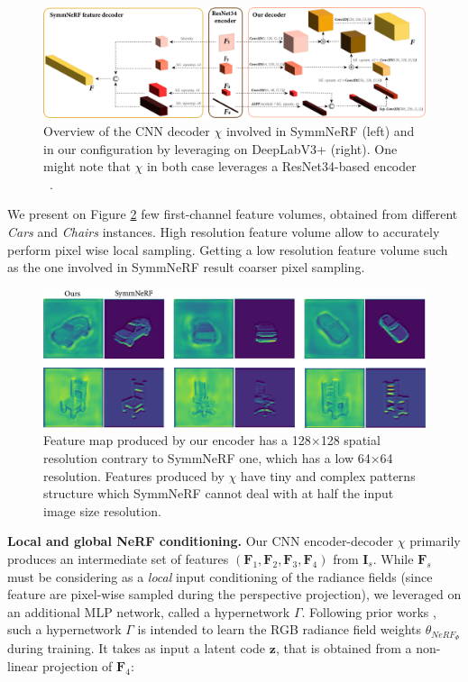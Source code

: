 \begin{figure}[h!]
  \begin{center}
  \includegraphics[width=\linewidth]{images/epinerf/feature_fusion_encoder.png}
  \end{center}
     \caption{Overview of the CNN decoder $\chi$ involved in SymmNeRF (left) and in our configuration by leveraging on DeepLabV3+ (right). One might note that $\chi$ in both case leverages a ResNet34-based encoder ~\cite{he2016deep}. }
  \label{fig:feature_encoder}
  \end{figure}

We present on Figure \ref{fig:feature_illustration} few first-channel feature volumes, obtained from different \textit{Cars} and \textit{Chairs} instances.  High resolution feature volume allow to accurately perform pixel wise local sampling. Getting a low resolution feature volume such as the one involved in SymmNeRF result coarser pixel sampling. 

\begin{figure}[h!]
\begin{center}
\includegraphics[width=.85\linewidth]{images/epinerf/feature_supp.png}
\end{center}
   \caption{Feature map produced by our encoder has a 128$\times$128 spatial resolution contrary to SymmNeRF one, which has a low  64$\times$64 resolution. Features produced by $\chi$ have tiny and complex patterns structure which SymmNeRF cannot deal with at half the input image size resolution.}
\label{fig:feature_illustration}
\end{figure}

\noindent\textbf{Local and global NeRF conditioning.} Our CNN encoder-decoder $\chi$ primarily produces an intermediate set of features $(\mathbf{F}_{1},\mathbf{F}_{2},\mathbf{F}_{3},\mathbf{F}_{4})$ from $\textbf{I}_{s}$. While $\mathbf{F}_{s}$ must be considering as a \textit{local} input conditioning of the radiance fields (since feature are pixel-wise sampled during the perspective projection), we leveraged on an additional MLP network, called a hypernetwork $\Gamma$. Following prior works \cite{SRN,symmnerf}, such a hypernetwork $\Gamma$ is intended to learn the RGB radiance field weights $\theta_{NeRF_{\Phi}}$ during training. It takes as input a latent code $\mathbf{z}$, that is obtained from a non-linear projection of $\mathbf{F}_{4}$:

